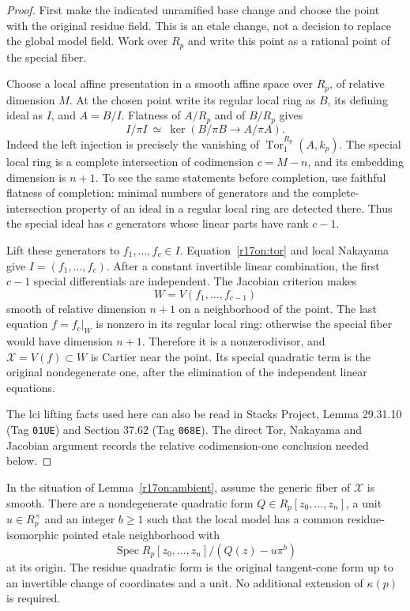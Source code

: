 \begin{proof}
First make the indicated unramified base change and
choose the point with the original residue field. This
is an etale change, not a decision to replace the global
model field. Work over $R_p$ and write this point as a
rational point of the special fiber.

Choose a local affine presentation in a smooth affine
space over $R_p$, of relative dimension $M$. At the
chosen point write its regular local ring as $B$,
its defining ideal as $I$, and $A=B/I$.
Flatness of $A/R_p$ and of $B/R_p$ gives
\[
 I/\pi I\ \simeq\
  \ker(B/\pi B\longrightarrow A/\pi A).
 \tag{ON17.1}\label{r17on:tor}
\]
Indeed the left injection is precisely the vanishing of
$\operatorname{Tor}_1^{R_p}(A,k_p)$.
The special local ring is a complete intersection of
codimension $c=M-n$, and its embedding dimension is
$n+1$. To see the same statements before completion,
use faithful flatness of completion: minimal numbers
of generators and the complete-intersection property
of an ideal in a regular local ring are detected there.
Thus the special ideal has $c$ generators whose linear
parts have rank $c-1$.

Lift these generators to $f_1,\ldots,f_c\in I$.
Equation~\eqref{r17on:tor} and local Nakayama give
$I=(f_1,\ldots,f_c)$. After a constant invertible
linear combination, the first $c-1$ special differentials
are independent. The Jacobian criterion makes
\[
                  W=V(f_1,\ldots,f_{c-1})
\]
smooth of relative dimension $n+1$ on a neighborhood of
the point. The last equation $f=f_c|_W$ is nonzero in
its regular local ring: otherwise the special fiber
would have dimension $n+1$. Therefore it is a
nonzerodivisor, and $\mathcal X=V(f)\subset W$ is
Cartier near the point. Its special quadratic term is
the original nondegenerate one, after the elimination
of the independent linear equations.

The lci lifting facts used here can also be read in
Stacks Project, Lemma 29.31.10 (Tag \texttt{01UE}) and
Section 37.62 (Tag \texttt{068E}). The direct Tor,
Nakayama and Jacobian argument records the relative
codimension-one conclusion needed below.
\end{proof}

\begin{proposition}
\label{r17on:normal-form}
In the situation of Lemma~\ref{r17on:ambient}, assume
the generic fiber of $\mathcal X$ is smooth.
There are a nondegenerate quadratic form
$Q\in R_p[z_0,\ldots,z_n]$, a unit $u\in R_p^\times$
and an integer $b\ge1$ such that the local model has a
common residue-isomorphic pointed etale neighborhood with
\[
       \operatorname{Spec}
       R_p[z_0,\ldots,z_n]/(Q(z)-u\pi^b)
 \tag{ON17.2}\label{r17on:exact}
\]
at its origin. The residue quadratic form is the
original tangent-cone form up to an invertible change
of coordinates and a unit. No additional extension of
$\kappa(p)$ is required.
\end{proposition}

